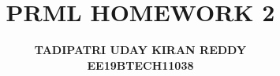 \documentclass{article}
\begin{document}
\title{{\textbf{PRML HOMEWORK 2}}}
\author{\textbf{TADIPATRI UDAY KIRAN REDDY}\\\textbf{EE19BTECH11038}}
\maketitle
\end{document}
